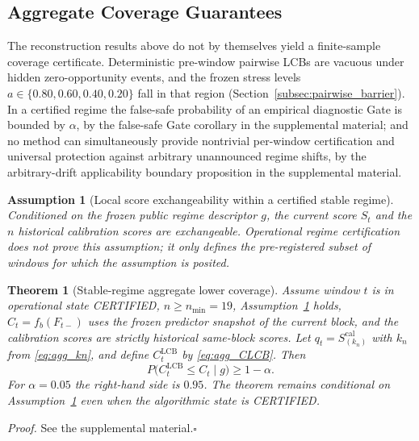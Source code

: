 \documentclass[letterpaper,journal]{IEEEtran}
\newtheorem{theorem}{Theorem}
\newtheorem{assumption}{Assumption}
\begin{document}
\subsection{Aggregate Coverage Guarantees}
\label{subsec:agg_coverage_theory}

The reconstruction results above do not by themselves yield a finite-sample
coverage certificate.  Deterministic pre-window pairwise LCBs are vacuous
under hidden zero-opportunity events, and the frozen stress levels
$a\in\{0.80,0.60,0.40,0.20\}$ fall in that region
(Section~\ref{subsec:pairwise_barrier}).  In a certified regime the
false-safe probability of an empirical diagnostic Gate is bounded by
$\alpha$, by the false-safe Gate corollary in the supplemental material; and
no method can simultaneously provide nontrivial per-window certification and
universal protection against arbitrary unannounced regime shifts, by the
arbitrary-drift applicability boundary proposition in the supplemental
material.

\begin{assumption}[Local score exchangeability within a certified stable regime]
\label{ass:score-exchangeability}
Conditioned on the frozen public regime descriptor $g$, the current score
$S_t$ and the $n$ historical calibration scores are exchangeable.  Operational
regime certification does not prove this assumption; it only defines the
pre-registered subset of windows for which the assumption is posited.
\end{assumption}

\begin{theorem}[Stable-regime aggregate lower coverage]
\label{thm:agg-lcb}
Assume window $t$ is in operational state CERTIFIED, $n\ge n_{\min}=19$,
Assumption~\ref{ass:score-exchangeability} holds, $\widehat C_t=f_b(F_{t-})$
uses the frozen predictor snapshot of the current block, and the calibration
scores are strictly historical same-block scores.  Let
$q_t=S_{(k_n)}^{\mathrm{cal}}$ with $k_n$ from \eqref{eq:agg_kn}, and define
$C^{\mathrm{LCB}}_t$ by \eqref{eq:agg_CLCB}.  Then
\begin{equation}
 P\bigl(C^{\mathrm{LCB}}_t\le C_t\mid g\bigr)\ge 1-\alpha.
 \label{eq:agg_thm1}
\end{equation}
For $\alpha=0.05$ the right-hand side is $0.95$.  The theorem remains
conditional on Assumption~\ref{ass:score-exchangeability} even when the
algorithmic state is CERTIFIED.
\end{theorem}

\noindent\emph{Proof.}
See the supplemental material.\hfill$\square$
\end{document}
